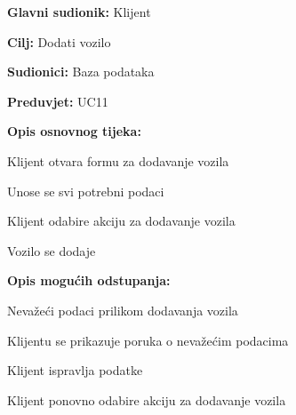 \noindent {}
\begin{packed_item}

	\item \textbf{Glavni sudionik:} Klijent
	\item \textbf{Cilj:} Dodati vozilo
	\item \textbf{Sudionici:} Baza podataka
	\item \textbf{Preduvjet:} UC11
	\item \textbf{Opis osnovnog tijeka:}
	
	\item[] \begin{packed_enum}
		
		\item Klijent otvara formu za dodavanje vozila
		\item Unose se svi potrebni podaci
		\item Klijent odabire akciju za dodavanje vozila
		\item Vozilo se dodaje

	\end{packed_enum}
	
	\item  \textbf{Opis mogućih odstupanja:}
	
	\item[] \begin{packed_item}
		
		\item[2.a] Nevažeći podaci prilikom dodavanja vozila
		\item[] \begin{packed_enum}
			
			\item Klijentu se prikazuje poruka o nevažećim podacima
			\item Klijent ispravlja podatke
			\item Klijent ponovno odabire akciju za dodavanje vozila
			
		\end{packed_enum}
		
	\end{packed_item}
\end{packed_item}

\pagebreak


